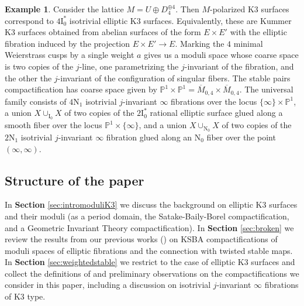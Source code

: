 \documentclass[11pt]{amsart}
\theoremstyle{definition}
\newtheorem{example}[theorem]{Example}
\theoremstyle{remark}
\newcommand{\mb}[1]{\mathbb{#1}}
\begin{document}
	
	\begin{example} Consider the lattice $M = U \oplus D_4^{\oplus 4}$. Then $M$-polarized K3 surfaces correspond to $4\mathrm{I}_0^*$ isotrivial elliptic K3 surfaces. Equivalently, these are Kummer K3 surfaces obtained from abelian surfaces of the form $E \times E'$ with the elliptic fibration induced by the projection $E \times E' \to E$. Marking the $4$ minimal Weierstrass cusps by a single weight $a$ gives us a moduli space whose coarse space is two copies of the $j$-line, one parametrizing the $j$-invariant of the fibration, and the other the $j$-invariant of the configuration of singular fibers. The stable pairs compactification has coarse space given by $\mathbb{P}^1 \times \mathbb{P}^1 = \overline{M}_{0,4} \times \overline{M}_{0,4}$. The universal family consists of $4\mathrm{N}_1$ isotrivial $j$-invariant $\infty$ fibrations over the locus $\{\infty\} \times \mathbb{P}^1$, a union $X \cup_{\mathrm{I_0}} X$ of two copies of the $2\mathrm{I}_0^*$ rational elliptic surface glued along a smooth fiber over the locus $\mb{P}^1 \times \{\infty\}$, and a union $X \cup_{\mathrm{N}_0} X$ of two copies of the $2\mathrm{N}_1$ isotrivial $j$-invariant $\infty$ fibration glued along an $\mathrm{N}_0$ fiber over the point $(\infty, \infty)$. 
	\end{example} 
	
	\subsection{Structure of the paper}
	In \textbf{Section} \ref{sec:intromoduliK3} we discuss the background on elliptic K3 surfaces and their moduli (as a period domain, the Satake-Baily-Borel compactification, and a Geometric Invariant Theory compactification). In \textbf{Section} \ref{sec:broken} we review the results from our previous works (\cite{calculations, tsm, master, tsm2}) on KSBA compactifications of moduli spaces of elliptic fibrations and the connection with twisted stable maps. In \textbf{Section} \ref{sec:weightedstable} we restrict to the case of elliptic K3 surfaces and collect the definitions of and preliminary observations on the compactifications we consider in this paper, including a discussion on isotrivial $j$-invariant $\infty$ fibrations of K3 type. 
	
\end{document}
